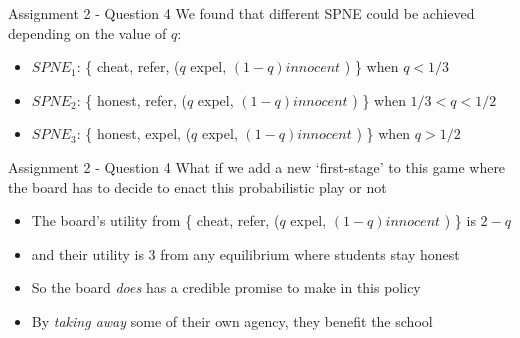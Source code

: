 \begin{frame}{Assignment 2 - Question 4}
  We found that different SPNE could be achieved depending on the value of $q$:
  \begin{itemize}
    \item \underline{$SPNE_1$}: \{ cheat, refer, ($q$ expel, $(1-q) innocent$ ) \} when $q<1/3$ 
    \item \underline{$SPNE_2$}: \{ honest, refer, ($q$ expel, $(1-q) innocent$ ) \} when $1/3<q<1/2$ 
    \item \underline{$SPNE_3$}: \{ honest, expel, ($q$ expel, $(1-q) innocent$ ) \} when $q>1/2$ 
  \end{itemize} 
\end{frame}

\begin{frame}{Assignment 2 - Question 4}
  What if we add a new `first-stage' to this game where the board has to decide to enact this probabilistic play or not 
  \begin{itemize}
    \item The board's utility from \{ cheat, refer, ($q$ expel, $(1-q) innocent$ ) \} is $2-q$
    \item and their utility is 3 from any equilibrium where students stay honest 
    \item So the board \textit{does} has a credible promise to make in this policy
    \item By \textit{taking away} some of their own agency, they benefit the school
  \end{itemize}
\end{frame}
